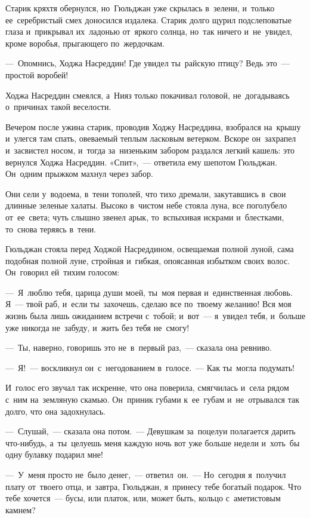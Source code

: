 \documentclass[12pt,a4paper]{book}
\begin{document}
Старик кряхтя обернулся, но~Гюльджан уже скрылась в~зелени, и~только ее~серебристый смех доносился издалека. Старик долго щурил подслеповатые глаза и~прикрывал их~ладонью от~яркого солнца, но~так ничего и~не~увидел, кроме воробья, прыгающего по~жердочкам.

—~Опомнись, Ходжа Насреддин! Где увидел ты~райскую птицу? Ведь это~— простой воробей!

Ходжа Насреддин смеялся, а~Нияз только покачивал головой, не~догадываясь о~причинах такой веселости.

Вечером после ужина старик, проводив Ходжу Насреддина, взобрался на~крышу и~улегся там спать, овеваемый теплым ласковым ветерком. Вскоре он~захрапел и~засвистел носом, и~тогда за~низеньким забором раздался легкий кашель: это вернулся Ходжа Насреддин. «Спит»,~— ответила ему шепотом Гюльджан. Он~одним прыжком махнул через забор.

Они сели у~водоема, в~тени тополей, что тихо дремали, закутавшись в~свои длинные зеленые халаты. Высоко в~чистом небе стояла луна, все поголубело от~ее~света; чуть слышно звенел арык, то~вспыхивая искрами и~блестками, то~снова теряясь в~тени.

Гюльджан стояла перед Ходжой Насреддином, освещаемая полной луной, сама подобная полной луне, стройная и~гибкая, опоясанная избытком своих волос. Он~говорил ей~тихим голосом:

—~Я~люблю тебя, царица души моей, ты~моя первая и~единственная любовь. Я~— твой раб, и~если ты~захочешь, сделаю все по~твоему желанию! Вся моя жизнь была лишь ожиданием встречи с~тобой; и~вот~— я~увидел тебя, и~больше уже никогда не~забуду, и~жить без тебя не~смогу!

—~Ты, наверно, говоришь это не~в~первый раз,~— сказала она ревниво.

—~Я!~— воскликнул он~с~негодованием в~голосе.~— Как ты~могла подумать!

И~голос его звучал так искренне, что она поверила, смягчилась и~села рядом с~ним на~земляную скамью. Он~приник губами к~ее~губам и~не~отрывался так долго, что она задохнулась.

—~Слушай,~— сказала она потом.~— Девушкам за~поцелуи полагается дарить что-нибудь, а~ты~целуешь меня каждую ночь вот уже больше недели и~хоть~бы одну булавку подарил мне!

—~У~меня просто не~было денег,~— ответил~он.~— Но~сегодня я~получил плату от~твоего отца, и~завтра, Гюльджан, я~принесу тебе богатый подарок. Что тебе хочется~— бусы, или платок, или, может быть, кольцо с~аметистовым камнем?
\end{document}
